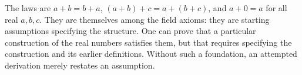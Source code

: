 The laws are $a+b=b+a$, $(a+b)+c=a+(b+c)$, and $a+0=a$ for all real $a,b,c$. They are themselves among the field axioms: they are starting assumptions specifying the structure. One can prove that a particular construction of the real numbers satisfies them, but that requires specifying the construction and its earlier definitions. Without such a foundation, an attempted derivation merely restates an assumption.
